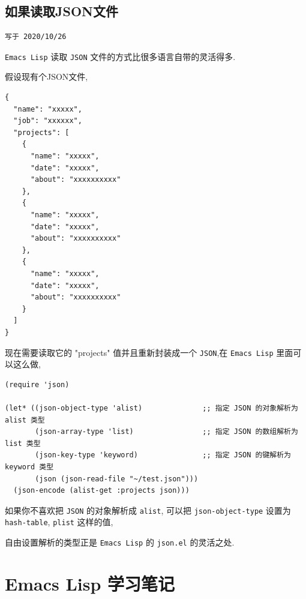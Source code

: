 \documentclass[11pt]{article}
\begin{document}
\subsection{如果读取JSON文件}
\label{sec:org0814dfa}
\begin{verbatim}
写于 2020/10/26
\end{verbatim}
\texttt{Emacs Lisp} 读取 \texttt{JSON} 文件的方式比很多语言自带的灵活得多.

假设现有个JSON文件,

\begin{verbatim}
{
  "name": "xxxxx",
  "job": "xxxxxx",
  "projects": [
    {
      "name": "xxxxx",
      "date": "xxxxx",
      "about": "xxxxxxxxxx"
    },
    {
      "name": "xxxxx",
      "date": "xxxxx",
      "about": "xxxxxxxxxx"
    },
    {
      "name": "xxxxx",
      "date": "xxxxx",
      "about": "xxxxxxxxxx"
    }
  ]
}
\end{verbatim}

现在需要读取它的 "projects" 值并且重新封装成一个 \texttt{JSON},在 \texttt{Emacs Lisp} 里面可以这么做,

\begin{verbatim}
(require 'json)

(let* ((json-object-type 'alist)              ;; 指定 JSON 的对象解析为 alist 类型
       (json-array-type 'list)                ;; 指定 JSON 的数组解析为 list 类型
       (json-key-type 'keyword)               ;; 指定 JSON 的键解析为 keyword 类型
       (json (json-read-file "~/test.json")))
  (json-encode (alist-get :projects json)))
\end{verbatim}

如果你不喜欢把 \texttt{JSON} 的对象解析成 \texttt{alist}, 可以把 \texttt{json-object-type} 设置为 \texttt{hash-table}, \texttt{plist} 这样的值,

自由设置解析的类型正是 \texttt{Emacs Lisp} 的 \texttt{json.el} 的灵活之处.


\section{Emacs Lisp 学习笔记}
\label{sec:org59dbc11}
\end{document}
